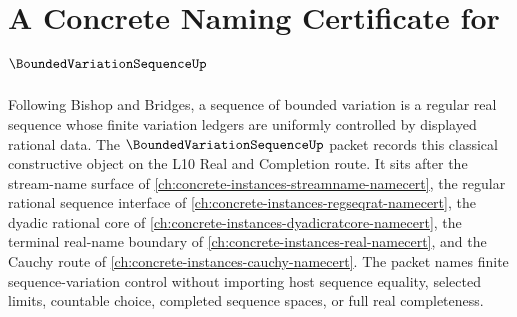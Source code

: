 \chapter{A Concrete Naming Certificate for $\BoundedVariationSequenceUp$}
\label{ch:concrete-instances-bounded-variation-sequence-namecert}

Following Bishop and Bridges, a sequence of bounded variation is a regular real sequence whose finite variation ledgers are uniformly controlled by displayed rational data. The $\BoundedVariationSequenceUp$ packet records this classical constructive object on the L10 Real and Completion route. It sits after the stream-name surface of \autoref{ch:concrete-instances-streamname-namecert}, the regular rational sequence interface of \autoref{ch:concrete-instances-regseqrat-namecert}, the dyadic rational core of \autoref{ch:concrete-instances-dyadicratcore-namecert}, the terminal real-name boundary of \autoref{ch:concrete-instances-real-namecert}, and the Cauchy route of \autoref{ch:concrete-instances-cauchy-namecert}. The packet names finite sequence-variation control without importing host sequence equality, selected limits, countable choice, completed sequence spaces, or full real completeness.

